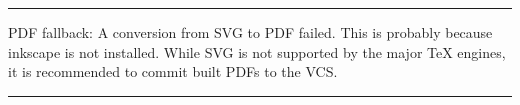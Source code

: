 \documentclass{article}
\begin{document}
\selectfont
\vfil
\color{red}
\hrule height 1pt
\color{black}
\vskip 6pt
\noindent PDF fallback: A conversion from SVG to PDF failed.  This is probably
because inkscape is not installed.  While SVG is not supported by
the major TeX engines, it is recommended to commit built PDFs
to the VCS.
\vskip 6pt
\color{red}
\hrule height 1pt
\vfil
\eject
\end{document}

